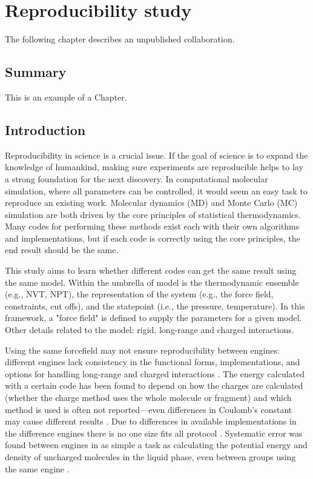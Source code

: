 \chapter{Reproducibility study}
\label{chap:reproducibility}

The following chapter describes an unpublished collaboration.

\section{Summary}
 
This is an example of a Chapter. 

\section{Introduction}
Reproducibility in science is a crucial issue.
If the goal of science is to expand the knowledge of humankind, making sure experiments are reproducible helps to lay a strong foundation for the next discovery.
In computational molecular simulation, where all parameters can be controlled, it would seem an easy task to reproduce an existing work.
Molecular dynamics (MD) and Monte Carlo (MC) simulation are both driven by the core principles of statistical thermodynamics.
Many codes for performing these methods exist each with their own algorithms and implementations, but if each code is correctly using the core principles, the end result should be the same.

This study aims to learn whether different codes can get the same result using the same model.
Within the umbrella of model is the thermodynamic ensemble (e.g., NVT, NPT), the representation of the system (e.g., the force field, constraints, cut offs), and the statepoint (i.e., the pressure, temperature).
In this framework, a "force field" is defined to supply the parameters for a given model.
Other details related to the model: rigid, long-range and charged interactions.

Using the same forcefield may not ensure reproducibility between engines: different engines lack consistency in the functional forms, implementations, and options for handling long-range and charged interactions \citep{Rizzi2020}. 
The energy calculated with a certain code has been found to depend on how the charges are calculated (whether the charge method uses the whole molecule or fragment) and which method is used is often not reported---even differences in Coulomb's constant may cause different results \citep{Shirts2017}.
Due to differences in available implementations in the difference engines there is no one size fits all protocol \citep{Loeffler2018}.
Systematic error was found between engines in as simple a task as calculating the potential energy and density of uncharged molecules in the liquid phase, even between groups using the same engine \citep{Schappals2017}.


